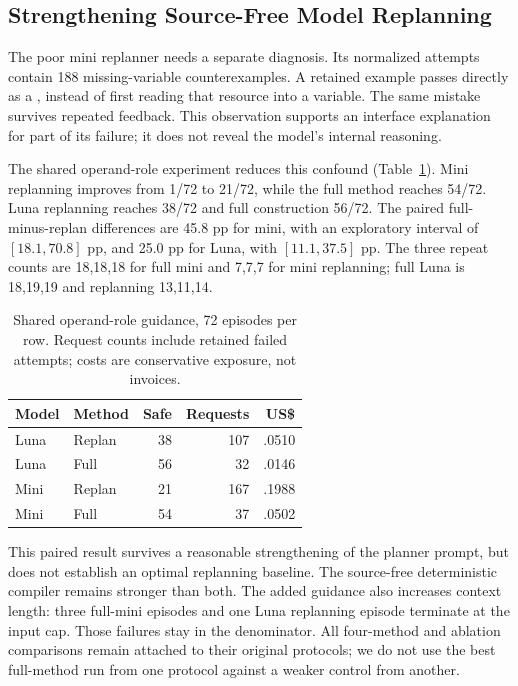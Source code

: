 \subsection{Strengthening Source-Free Model Replanning}
The poor mini replanner needs a separate diagnosis. Its normalized attempts contain 188 missing-variable counterexamples. A retained example passes  directly as a , instead of first reading that resource into a variable. The same mistake survives repeated feedback. This observation supports an interface explanation for part of its failure; it does not reveal the model's internal reasoning.

The shared operand-role experiment reduces this confound (Table~\ref{tab:typed}). Mini replanning improves from 1/72 to 21/72, while the full method reaches 54/72. Luna replanning reaches 38/72 and full construction 56/72. The paired full-minus-replan differences are 45.8 pp for mini, with an exploratory interval of $[18.1,70.8]$ pp, and 25.0 pp for Luna, with $[11.1,37.5]$ pp. The three repeat counts are 18,18,18 for full mini and 7,7,7 for mini replanning; full Luna is 18,19,19 and replanning 13,11,14.

\begin{table}[t]
\centering\caption{Shared operand-role guidance, 72 episodes per row. Request counts include retained failed attempts; costs are conservative exposure, not invoices.}\label{tab:typed}
\begin{tabular}{llrrr}\toprule
Model & Method & Safe & Requests & US\$\\\midrule
Luna & Replan & 38 & 107 & .0510\\
Luna & Full & 56 & 32 & .0146\\
Mini & Replan & 21 & 167 & .1988\\
Mini & Full & 54 & 37 & .0502\\\bottomrule
\end{tabular}
\end{table}

This paired result survives a reasonable strengthening of the planner prompt, but does not establish an optimal replanning baseline. The source-free deterministic compiler remains stronger than both. The added guidance also increases context length: three full-mini episodes and one Luna replanning episode terminate at the input cap. Those failures stay in the denominator. All four-method and ablation comparisons remain attached to their original protocols; we do not use the best full-method run from one protocol against a weaker control from another.

